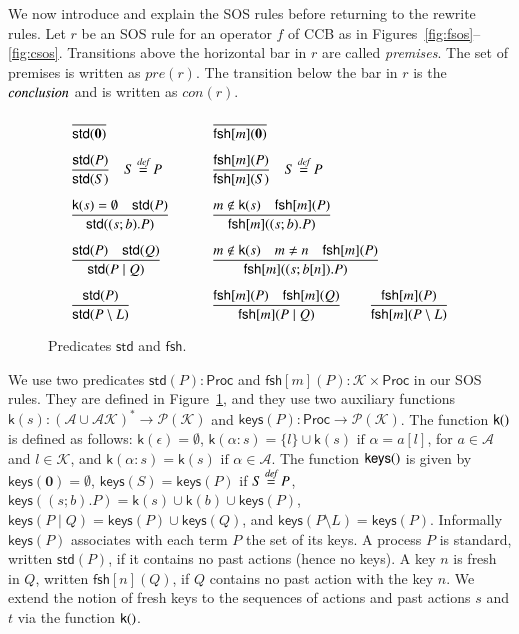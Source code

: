 \documentclass[review]{elsarticle}
\newcommand{\paral}{\; \vert \;}
\newcommand{\Rule}[2]{\displaystyle{\frac{#1}{#2}}}
\newcommand{\Proc}{\mathsf{Proc}}
\newcommand{\restrict}[1]{\!\setminus\!#1}
\newcommand{\Nil}{\mathbf{0}}
\newcommand{\std}[1]{\mathsf{std}(#1)}
\newcommand{\keys}[1]{\mathsf{keys}(#1)}
\newcommand{\kkey}[1]{\mathsf{k}(#1)}
\newcommand{\Keys}{\mathcal{K}}
\newcommand{\freshpred}[1]{\mathsf{fsh}[#1]}
\newcommand{\fresh}[2]{\mathsf{fsh}[#1](#2)}
\newcommand{\bydef}{\stackrel{\emph{def}}{=}}
\begin{document}
We now introduce and explain the SOS rules before returning to 
the rewrite rules. Let $r$ be an SOS rule for an operator $f$ of CCB as in 
Figures~\ref{fig:fsos}--\ref{fig:csos}. 
Transitions above the horizontal bar in $r$ are called \emph{premises}. 
The set of premises is written as
$pre(r)$. The transition below the bar in $r$ is the $\emph{conclusion}$ and 
is written as $con(r)$. 
%
\begin{figure}[t] 
\[
\begin{array}{ll}
\Rule
{}
{\std{\Nil}}
\qquad &
\Rule
{}
{\fresh{m}{\Nil}}
\\[15pt]
\Rule
{\std{P}}
{\std{S}}
\quad
S \bydef P
\qquad &
\Rule
{\fresh{m}{P}}
{\fresh{m}{S}}
\quad
S \bydef P
\\[15pt]
\Rule
{\kkey{s}=\emptyset \quad  \std{P}}
{\std{(s;b).P}}
\qquad &
\Rule
{m \notin \kkey{s} \quad \fresh{m}{P}}
{\fresh{m}{(s;b).P}}
\\[15pt]
\Rule
{\std{P} \quad \std{Q}}
{\std{P \paral Q}}
\qquad &
\Rule
{m \notin \kkey{s} \quad m \neq n \quad \fresh{m}{P}}
{\fresh{m}{(s;b[n]).P}}
\\[15pt]
\Rule
{\std{P}}
{\std{P \setminus L}}
\qquad &
\Rule
{\fresh{m}{P} \quad \fresh{m}{Q}}
{\fresh{m}{P \paral Q}}
\qquad 
\Rule
{\fresh{m}{P}}
{\fresh{m}{P \setminus L}}
\end{array}
\] 
\caption{Predicates $\mathsf{std}$ and $\mathsf{fsh}$.} 
\label{fig:predicates}
\end{figure}
%
We use two predicates $\std{P}:\Proc$ and $\fresh{m}{P}:\Keys \times \Proc$ in our SOS rules. 
They are defined in Figure~\ref{fig:predicates}, and they use two auxiliary functions
$\kkey{s}: (\mathcal{A}\cup\mathcal{AK})^* \rightarrow \mathcal{P}(\Keys)$ and
$\keys{P}: \Proc \rightarrow \mathcal{P}(\Keys)$. 
The function $\kkey$ is defined as follows:
$\kkey{\epsilon}=\emptyset$, $\kkey{\alpha:s}=\{l\}\cup\kkey{s} \text{ if }\alpha=a[l]$, for 
$a\in \mathcal{A}$ and $l\in \Keys$, and $\kkey{\alpha:s}= \kkey{s} \text{ if }\alpha \in \mathcal{A}$.
The function $\keys$ is given by $\keys{\Nil}=\emptyset$, $\keys{S}=\keys{P}$ if $S\bydef P$, $\keys{(s;b).
P}=\kkey{s} \cup \kkey{b} \cup \keys{P}$, $\keys{P \paral Q}= \keys{P} \cup \keys{Q}$, and $\keys{P \restrict L}=\keys{P}$. Informally $\keys{P}$ associates with each term $P$ the set of its keys. 
A process $P$ is standard, written $\std{P}$, if it contains no past actions (hence no keys). 
A key $n$ is fresh in $Q$, written $\freshpred{n}(Q)$, if $Q$ contains no past action with the key $n$.
We extend the notion of fresh keys to the sequences of actions and past actions $s$ and $t$ 
via the function $\kkey$.
\end{document}
